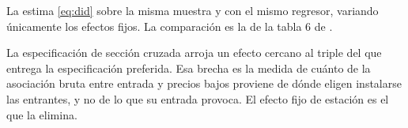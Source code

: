 La  estima \eqref{eq:did} sobre la misma muestra y con el mismo regresor, variando únicamente los efectos fijos. La comparación es la de la tabla 6 de \textcite{ARCIDIACONO2020}.

\begin{table}[H]
\centering
\caption{Efecto estimado según los efectos fijos incluidos}
\label{tab:escalera}
\end{table}

La especificación de sección cruzada arroja un efecto cercano al triple del que entrega la especificación preferida. Esa brecha es la medida de cuánto de la asociación bruta entre entrada y precios bajos proviene de dónde eligen instalarse las entrantes, y no de lo que su entrada provoca. El efecto fijo de estación es el que la elimina.

